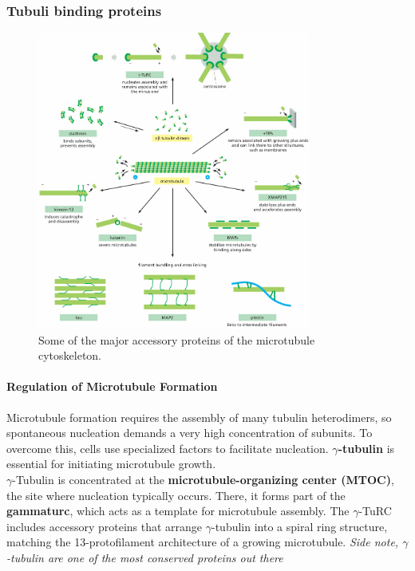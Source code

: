 \documentclass[../main.tex]{subfiles}
\begin{document}
\subsubsection{Tubuli binding proteins}

\begin{figure}[H]
	\centering
	\includegraphics[width = 0.8\textwidth]{20}
	\caption{Some of the major accessory proteins of the microtubule cytoskeleton.}
\end{figure}

\paragraph{Regulation of Microtubule Formation}

Microtubule formation requires the assembly of many tubulin heterodimers, so spontaneous nucleation demands a very high concentration of subunits. To overcome this, cells use specialized factors to facilitate nucleation. \textbf{$\gamma$-tubulin} is essential for initiating microtubule growth. \\
\indent $\gamma$-Tubulin is concentrated at the \textbf{microtubule-organizing center (MTOC)}, the site where nucleation typically occurs. There, it forms part of the \textbf{\gls{gammaturc}}, which acts as a template for microtubule assembly. The $\gamma$-TuRC includes accessory proteins that arrange $\gamma$-tubulin into a spiral ring structure, matching the 13-protofilament architecture of a growing microtubule. \textit{Side note, $\gamma$-tubulin are one of the most conserved proteins out there}
\end{document}
